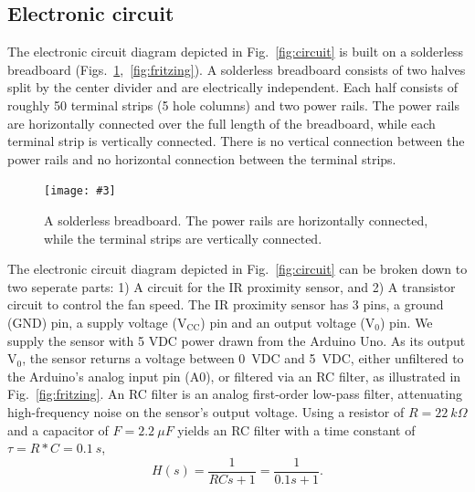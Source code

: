 \documentclass[10pt,twoside,openright]{article}
\newcommand{\mijnfiguur}[5][ht]{            %
    \begin{figure}[#1]                      %
        \begin{center}                      %
            \texttt{[image: \#3]}        %
        \end{center}
        \caption{#4\label{#5}}          %
    \end{figure}
    }
\begin{document}
\subsection{Electronic circuit}
The electronic circuit diagram depicted in Fig.~\ref{fig:circuit} is built on a solderless breadboard (Figs.~\ref{fig:breadboard},~\ref{fig:fritzing}). A solderless breadboard consists of two halves split by the center divider and are electrically independent. Each half consists of roughly 50 terminal strips (5 hole columns) and two power rails. The power rails are horizontally connected over the full length of the breadboard, while each terminal strip is vertically connected. There is no vertical connection between the power rails and no horizontal connection between the terminal strips.\\

\mijnfiguur[h!]{width=9cm}{breadboard.pdf}{A solderless breadboard. The power rails are horizontally connected, while the terminal strips are vertically connected.}{fig:breadboard}

The electronic circuit diagram depicted in Fig.~\ref{fig:circuit} can be broken down to two seperate parts: 1) A circuit for the IR proximity sensor, and 2) A transistor circuit to control the fan speed. The IR proximity sensor has 3 pins, a ground (GND) pin, a supply voltage ($\text{V}_{\text{CC}}$) pin and an output voltage ($\text{V}_{0}$) pin. We supply the sensor with 5 VDC power drawn from the Arduino Uno. As its output $\text{V}_{0}$, the sensor returns a voltage between 0~VDC and 5~VDC, either unfiltered to the Arduino's analog input pin (A0), or filtered via an RC filter, as illustrated in Fig.~\ref{fig:fritzing}. An RC filter is an analog first-order low-pass filter, attenuating high-frequency noise on the sensor's output voltage. Using a resistor of $R=22~k\Omega$ and a capacitor of $F=2.2~\mu F$ yields an RC filter with a time constant of $\tau = R*C = 0.1~s$,
\begin{equation}
H(s) = \frac{1}{RC s + 1} = \frac{1}{0.1s + 1}.
\end{equation}
\end{document}

